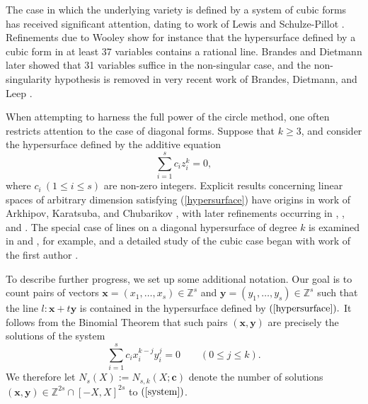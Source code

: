 \documentclass{amsart}%
\numberwithin{equation}{section}
\theoremstyle{remark}
\newcommand{\1}{\mathbbm{1}}
\begin{document}
The case in which the underlying variety is defined by a system of cubic forms has received significant attention, dating to work of Lewis and Schulze-Pillot \cite{MR0755988}. Refinements due to Wooley \cite{MR1458715} show for instance that the hypersurface defined by a cubic form in at least 37 variables contains a rational line. Brandes and Dietmann \cite{MR4268805} later showed that 31 variables suffice in the non-singular case, and the non-singularity hypothesis is removed in very recent work of Brandes, Dietmann, and Leep \cite{key2026}. 

When attempting to harness the full power of the circle method, one often restricts attention to the case of diagonal forms. Suppose that $k \ge 3$, and consider the hypersurface defined by the additive equation
\begin{equation}\label{hypersurface}
    \sum_{i=1}^sc_iz^k_i=0,
\end{equation}
where $c_i\ (1\leq i\leq s)$ are non-zero integers. Explicit results concerning linear spaces of arbitrary dimension satisfying (\ref{hypersurface}) have origins in work of Arkhipov, Karatsuba, and Chubarikov \cite{MR608411}, with later refinements occurring in \cite{MR2149529}, \cite{MR2485413}, and \cite{MR3132907}. The special case of lines on a diagonal hypersurface of degree $k$ is examined  in \cite{MR1817503} and \cite{MR4744752}, for example, and a detailed study of the cubic case began with work of the first author \cite{MR1778504}. 

To describe further progress, we set up some additional notation.
Our goal is to count pairs of vectors $\boldsymbol{x}=(x_1,\ldots,x_s)\in \mathbb{Z}^s$ and $\boldsymbol{y}=(y_1,\ldots,y_s)\in \mathbb{Z}^s$ such that the line $l: \boldsymbol{x}+t\boldsymbol{y}$ is contained in the hypersurface defined by $(\ref{hypersurface}).$
It follows from the Binomial Theorem that such pairs $(\boldsymbol{x}, \boldsymbol{y})$ 
are precisely the solutions of the system
\begin{equation}\label{system}
     \sum_{i=1}^sc_ix_i^{k-j} y_i^j =0 \qquad (0 \le j \le k).
\end{equation}
We therefore let $N_{s}(X):=N_{s,k}(X;\boldsymbol{c})$ denote the number of solutions $(\boldsymbol{x},\boldsymbol{y})\in \mathbb{Z}^{2s}\cap [-X,X]^{2s}$ to $(\ref{system})$. 
\end{document}
